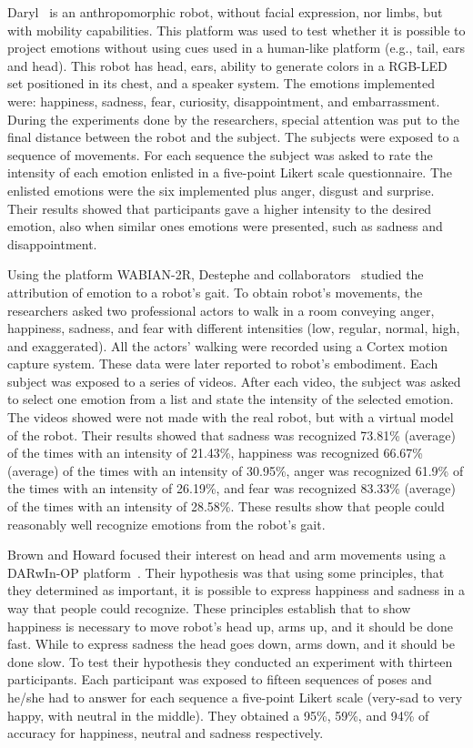 Daryl~\cite{Arras2012} is an anthropomorphic robot, without facial expression, nor limbs, but with mobility capabilities. This platform was used to test whether it is possible to project emotions without using cues used in a human-like platform (e.g., tail, ears and head). This robot has head, ears, ability to generate colors in a RGB-LED set positioned in its chest, and a speaker system. The emotions implemented were: happiness, sadness, fear, curiosity, disappointment, and embarrassment. During the experiments done by the researchers, special attention was put to the final distance between the robot and the subject. The subjects were exposed to a sequence of movements. For each sequence the subject was asked to rate the intensity of each emotion enlisted in a five-point Likert scale questionnaire. The enlisted emotions were the six implemented plus anger, disgust and surprise. Their results showed that participants gave a higher intensity to the desired emotion, also when similar ones emotions were presented, such as sadness and disappointment. 

Using the platform WABIAN-2R, Destephe and collaborators~\cite{Destephe2013b} studied the attribution of emotion to a robot's gait. To obtain  robot's movements, the researchers asked two professional actors to walk in a room conveying anger, happiness, sadness, and fear with different intensities (low, regular, normal, high, and exaggerated). All the actors' walking were recorded using a Cortex motion capture system. These data were later reported to robot's embodiment. Each subject was exposed to a series of videos. After each video, the subject was asked to select one emotion from a list and state the intensity of the selected emotion. The videos showed were not made with the real robot, but with a virtual model of the robot. Their results showed that sadness was recognized 73.81\% (average) of the times with an intensity of 21.43\%, happiness was recognized 66.67\% (average) of the times with an intensity of 30.95\%, anger was recognized 61.9\% of the times with an intensity of 26.19\%, and fear was recognized 83.33\% (average) of the times with an intensity of 28.58\%. These results show that people could reasonably well recognize emotions from the robot's gait.

Brown and Howard focused their interest on head and arm movements using a DARwIn-OP platform~\cite{Brown2014}. Their hypothesis was that using some principles, that they determined as important, it is possible to express happiness and sadness in a way that people could recognize. These principles establish that to show happiness is necessary to move robot's head up, arms up, and it should be done fast. While to express sadness the head goes down, arms down, and it should be done slow. To test their hypothesis they conducted an experiment with thirteen participants. Each participant was exposed to fifteen sequences of poses and he/she had to answer for each sequence a five-point Likert scale (very-sad to very happy, with neutral in the middle). They obtained a 95\%, 59\%, and 94\% of accuracy for happiness, neutral and sadness respectively. 
 
